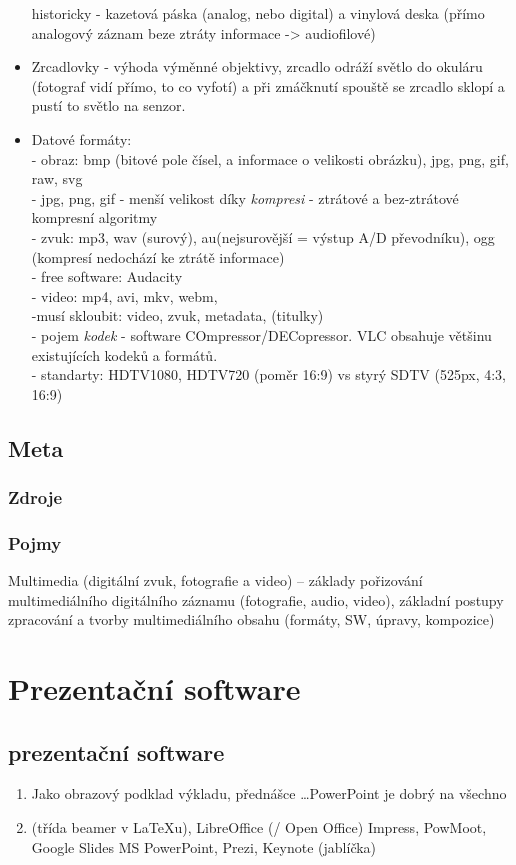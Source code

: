 \documentclass[12pt]{article}
\begin{document}
\begin{itemize}
historicky - kazetová páska (analog, nebo digital) a vinylová deska (přímo analogový záznam beze ztráty informace -> audiofilové)
\item Zrcadlovky - výhoda výměnné objektivy, zrcadlo odráží světlo do okuláru (fotograf vidí přímo, to co vyfotí) a při zmáčknutí spouště se zrcadlo sklopí a pustí to světlo na senzor.
\item Datové formáty:\\
 - obraz: bmp (bitové pole čísel, a informace o velikosti obrázku), jpg, png, gif, raw, svg\\
  -	jpg, png, gif - menší velikost díky \emph{kompresi} - ztrátové a bez-ztrátové kompresní algoritmy\\
 - zvuk: mp3, wav (surový), au(nejsurovější = výstup A/D převodníku),  ogg (kompresí nedochází ke ztrátě informace)\\
 - free software: Audacity\\
 - video: mp4, avi, mkv, webm,\\
  -musí skloubit: video, zvuk, metadata, (titulky)\\
  - pojem \emph{kodek} - software COmpressor/DECopressor. VLC obsahuje většinu existujících kodeků a formátů.\\
  - standarty: HDTV1080, HDTV720 (poměr 16:9) vs styrý SDTV (525px, 4:3, 16:9)   
\end{itemize}

\subsection{Meta}
\subsubsection{Zdroje}
\subsubsection{Pojmy}
Multimedia (digitální zvuk, fotografie a video) – základy pořizování multimediálního digitálního záznamu (fotografie, audio, video), základní postupy zpracování a tvorby multimediálního obsahu (formáty, SW, úpravy, kompozice)

\section{Prezentační software}
\subsection{prezentační software}
\begin{enumerate}
\item Jako obrazový podklad výkladu, přednášce \dots PowerPoint je dobrý na všechno
\item (třída beamer v \LaTeX u), LibreOffice (/ Open Office) Impress, PowMoot, Google Slides MS PowerPoint, Prezi, Keynote (jablíčka)
\end{enumerate}
\end{document}
